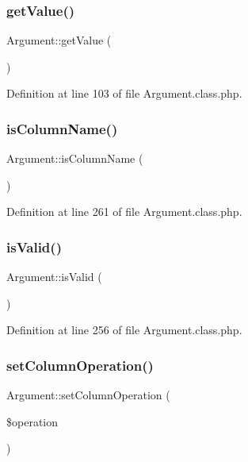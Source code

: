 \subsubsection{\texorpdfstring{get\+Value()}{getValue()}}
{\footnotesize\ttfamily Argument\+::get\+Value (\begin{DoxyParamCaption}{ }\end{DoxyParamCaption})}



Definition at line 103 of file Argument.\+class.\+php.

\hypertarget{classArgument_aced37db9a6cf1ec57e8acdea23797927}{}\label{classArgument_aced37db9a6cf1ec57e8acdea23797927} 
\subsubsection{\texorpdfstring{is\+Column\+Name()}{isColumnName()}}
{\footnotesize\ttfamily Argument\+::is\+Column\+Name (\begin{DoxyParamCaption}{ }\end{DoxyParamCaption})}



Definition at line 261 of file Argument.\+class.\+php.

\hypertarget{classArgument_a3e07b6c495166e96aea4e4f90bb0fe53}{}\label{classArgument_a3e07b6c495166e96aea4e4f90bb0fe53} 
\subsubsection{\texorpdfstring{is\+Valid()}{isValid()}}
{\footnotesize\ttfamily Argument\+::is\+Valid (\begin{DoxyParamCaption}{ }\end{DoxyParamCaption})}



Definition at line 256 of file Argument.\+class.\+php.

\hypertarget{classArgument_a3e737e0b4af5559f56b35c7c1b1b4f2a}{}\label{classArgument_a3e737e0b4af5559f56b35c7c1b1b4f2a} 
\subsubsection{\texorpdfstring{set\+Column\+Operation()}{setColumnOperation()}}
{\footnotesize\ttfamily Argument\+::set\+Column\+Operation (\begin{DoxyParamCaption}\item[{}]{\$operation }\end{DoxyParamCaption})}



